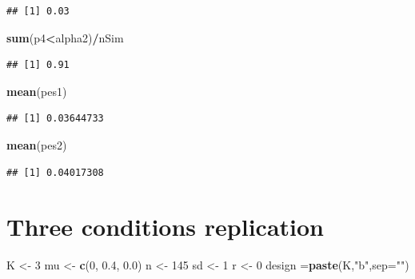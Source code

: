 \documentclass[]{book}
\newenvironment{Shaded}{\begin{snugshade}}{\end{snugshade}}
\newcommand{\DataTypeTok}[1]{\textcolor[rgb]{0.13,0.29,0.53}{#1}}
\newcommand{\DecValTok}[1]{\textcolor[rgb]{0.00,0.00,0.81}{#1}}
\newcommand{\FloatTok}[1]{\textcolor[rgb]{0.00,0.00,0.81}{#1}}
\newcommand{\KeywordTok}[1]{\textcolor[rgb]{0.13,0.29,0.53}{\textbf{#1}}}
\newcommand{\NormalTok}[1]{#1}
\newcommand{\OperatorTok}[1]{\textcolor[rgb]{0.81,0.36,0.00}{\textbf{#1}}}
\newcommand{\StringTok}[1]{\textcolor[rgb]{0.31,0.60,0.02}{#1}}
\begin{document}
\begin{verbatim}
## [1] 0.03
\end{verbatim}

\begin{Shaded}
\begin{Highlighting}[]
\KeywordTok{sum}\NormalTok{(p4}\OperatorTok{<}\NormalTok{alpha2)}\OperatorTok{/}\NormalTok{nSim}
\end{Highlighting}
\end{Shaded}

\begin{verbatim}
## [1] 0.91
\end{verbatim}

\begin{Shaded}
\begin{Highlighting}[]
\KeywordTok{mean}\NormalTok{(pes1)}
\end{Highlighting}
\end{Shaded}

\begin{verbatim}
## [1] 0.03644733
\end{verbatim}

\begin{Shaded}
\begin{Highlighting}[]
\KeywordTok{mean}\NormalTok{(pes2)}
\end{Highlighting}
\end{Shaded}

\begin{verbatim}
## [1] 0.04017308
\end{verbatim}

\hypertarget{three-conditions-replication-1}{%
\section{Three conditions replication}\label{three-conditions-replication-1}}

\begin{Shaded}
\begin{Highlighting}[]
\NormalTok{K <-}\StringTok{ }\DecValTok{3}
\NormalTok{mu <-}\StringTok{ }\KeywordTok{c}\NormalTok{(}\DecValTok{0}\NormalTok{, }\FloatTok{0.4}\NormalTok{, }\FloatTok{0.0}\NormalTok{)}
\NormalTok{n <-}\StringTok{ }\DecValTok{145}
\NormalTok{sd <-}\StringTok{ }\DecValTok{1}
\NormalTok{r <-}\StringTok{ }\DecValTok{0}
\NormalTok{design =}\KeywordTok{paste}\NormalTok{(K,}\StringTok{"b"}\NormalTok{,}\DataTypeTok{sep=}\StringTok{""}\NormalTok{)}
\end{Highlighting}
\end{Shaded}
\end{document}

